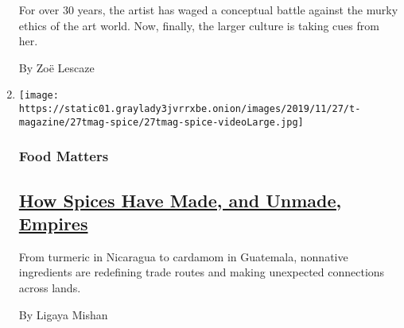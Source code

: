 \begin{enumerate}
  For over 30 years, the artist has waged a conceptual battle against
  the murky ethics of the art world. Now, finally, the larger culture is
  taking cues from her.

  By Zoë Lescaze
\item
  \texttt{[image: https://static01.graylady3jvrrxbe.onion/images/2019/11/27/t-magazine/27tmag-spice/27tmag-spice-videoLarge.jpg]}

  \hypertarget{food-matters}{%
  \subsubsection{Food Matters}\label{food-matters}}

  \hypertarget{how-spices-have-made-and-unmade-empires}{%
  \subsection{\texorpdfstring{\href{/2019/11/27/t-magazine/spices.html}{How
  Spices Have Made, and Unmade,
  Empires}}{How Spices Have Made, and Unmade, Empires}}\label{how-spices-have-made-and-unmade-empires}}

  From turmeric in Nicaragua to cardamom in Guatemala, nonnative
  ingredients are redefining trade routes and making unexpected
  connections across lands.

  By Ligaya Mishan
\end{enumerate}


